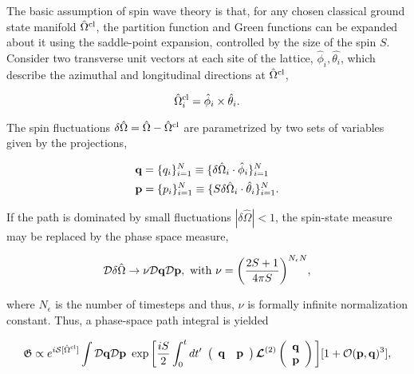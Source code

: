 The basic assumption of spin wave theory is that, for any chosen classical ground state manifold $\hat{\Omega}^{\textnormal{cl}}$, the partition function and Green functions can be expanded about it using the saddle-point expansion, controlled by the size of the spin $S$. \\

Consider two transverse unit vectors at each site of the lattice, $\hat{\phi}_i, \hat{\theta_i}$, which describe the azimuthal and longitudinal directions at $\hat{\Omega}^{\textnormal{cl}}$, 

$$
    \hat{\Omega}^{\textnormal{cl}}_i = \hat{\phi}_i \times \hat{\theta}_i. 
$$

The spin fluctuations $\delta\hat{\Omega} = \hat{\Omega} - \hat{\Omega}^{\textnormal{cl}}$ are parametrized by two sets of variables given by the projections, 

\begin{equation} \begin{split}
    &{\bf q} = \{q_i\}_{i=1}^{N} \equiv \{\delta\hat{\Omega}_i \cdot \hat{\phi}_i\}_{i=1}^{N} \\
    &{\bf p} = \{p_i\}_{i=1}^{N} \equiv \{S\delta\hat{\Omega}_i \cdot \hat{\theta}_i\}_{i=1}^{N}. 
\end{split}
\end{equation}

If the path is dominated by small fluctuations $|\delta\hat{\Omega}| < 1$, the spin-state measure may be replaced by the phase space measure,

\begin{equation}
    \mathcal{D} \delta\hat{\Omega} \rightarrow \nu \mathcal{D}{\bf q} \mathcal{D}{\bf p}, \textnormal{ with } \nu = \bigg(\frac{2S+1}{4\pi S}\bigg)^{N_{\epsilon} N},
\end{equation}

where $N_{\epsilon}$ is the number of timesteps and thus, $\nu$ is formally infinite normalization constant. Thus, a phase-space path integral is yielded 

\begin{equation}
    \mathfrak{G} \propto e^{i \mathcal{S}[\hat{\Omega}^{\textnormal{cl}}]} \int \mathcal{D}{\bf q} \mathcal{D}{\bf p} \textnormal{ } \exp \bigg[\frac{iS}{2} \int_{0}^t dt' \textnormal{ } \left( \begin{array}{cc}
          {\bf q} & {\bf p}
    \end{array}\right) \bm{\mathcal{L}}^{(2)} \left( \begin{array}{c}
          {\bf q} \\
          {\bf p}
    \end{array}\right)\bigg] [1+ \mathcal{O}({\bf p}, {\bf q})^3],
    \label{phase_space_spin_wave_path_int}
\end{equation}

